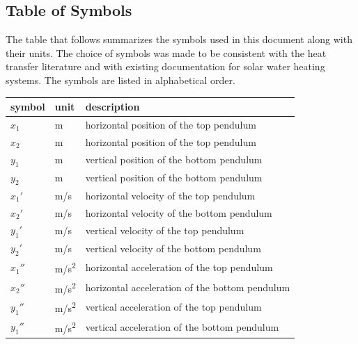 \documentclass[12pt]{article}
\begin{document}
\subsection{Table of Symbols}\label{sec_tableofsymbols}

The table that follows summarizes the symbols used in this document along with
their units. The choice of symbols was made to be consistent with the heat
transfer literature and with existing documentation for solar water heating
systems. The symbols are listed in alphabetical order.
~\newline

\renewcommand{\arraystretch}{1.2}
\begin{table}[H]
  \centering
  \noindent \begin{longtable*}{l l p{12cm}} 
  \toprule
  \textbf{symbol} & \textbf{unit} & \textbf{description}\\
  \midrule 
  $x_1$ & \si[per-mode=symbol] {\metre} & horizontal position of the top pendulum 
  \\
  $x_2$ & \si[per-mode=symbol] {\metre} & horizontal position of the top pendulum 
  \\
  $y_1$ & \si[per-mode=symbol] {\metre} & vertical position of the bottom pendulum 
  \\
  $y_2$ & \si[per-mode=symbol] {\metre} & vertical position of the bottom pendulum 
  \\
  ${x_1}'$ & \si[per-mode=symbol] {\metre\per\second} & horizontal velocity of the top pendulum 
  \\
  ${x_2}'$ & \si[per-mode=symbol] {\metre\per\second} & horizontal velocity of the bottom pendulum 
  \\
  ${y_1}'$ & \si[per-mode=symbol] {\metre\per\second} & vertical velocity of the top pendulum 
  \\
  ${y_2}'$ & \si[per-mode=symbol] {\metre\per\second} & vertical velocity of the bottom pendulum 
  \\
  ${x_1}''$ & \si[per-mode=symbol] {\metre\per\square\second} & horizontal acceleration of the top pendulum 
  \\
  ${x_2}''$ & \si[per-mode=symbol] {\metre\per\square\second} & horizontal acceleration of the bottom pendulum 
  \\
  ${y_1}''$ & \si[per-mode=symbol] {\metre\per\square\second} & vertical acceleration of the top pendulum 
  \\
  ${y_1}''$ & \si[per-mode=symbol] {\metre\per\square\second} & vertical acceleration of the bottom pendulum 

\end{longtable*}
\end{table}
\end{document}
